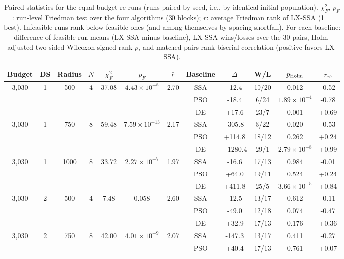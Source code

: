 \begin{table}[!t]
\centering
\caption{Paired statistics for the equal-budget re-runs (runs paired by seed, i.e., by identical initial population). $\chi^2_F$, $p_F$: run-level Friedman test over the four algorithms (30 blocks); $\bar r$: average Friedman rank of LX-SSA (1 = best). Infeasible runs rank below feasible ones (and among themselves by spacing shortfall). For each baseline: difference of feasible-run means (LX-SSA minus baseline), LX-SSA wins/losses over the 30 pairs, Holm-adjusted two-sided Wilcoxon signed-rank $p$, and matched-pairs rank-biserial correlation (positive favors LX-SSA).}
\label{tab:equalbudget-tests}
\scriptsize\setlength{\tabcolsep}{3pt}\renewcommand{\arraystretch}{0.93}
\begin{tabular}{cccccccccccc}
\toprule
Budget & DS & Radius & $N$ & $\chi^2_F$ & $p_F$ & $\bar r$ & Baseline & $\Delta$ & W/L & $p_{\rm Holm}$ & $r_{rb}$ \\
\midrule
3,030 & 1 & 500 & 4 & 37.08 & $4.43\times10^{-8}$ & 2.70 & SSA & -12.4 & 10/20 & 0.012 & -0.52 \\
 & & & & & &  & PSO & -18.4 & 6/24 & $1.89\times10^{-4}$ & -0.78 \\
 & & & & & &  & DE & +17.6 & 23/7 & 0.001 & +0.69 \\
\midrule
3,030 & 1 & 750 & 8 & 59.48 & $7.59\times10^{-13}$ & 2.17 & SSA & -305.8 & 8/22 & 0.020 & -0.53 \\
 & & & & & &  & PSO & +114.8 & 18/12 & 0.262 & +0.24 \\
 & & & & & &  & DE & +1280.4 & 29/1 & $2.79\times10^{-8}$ & +0.99 \\
\midrule
3,030 & 1 & 1000 & 8 & 33.72 & $2.27\times10^{-7}$ & 1.97 & SSA & -16.6 & 17/13 & 0.984 & -0.01 \\
 & & & & & &  & PSO & +64.0 & 19/11 & 0.524 & +0.24 \\
 & & & & & &  & DE & +411.8 & 25/5 & $3.66\times10^{-5}$ & +0.84 \\
\midrule
3,030 & 2 & 500 & 4 & 7.48 & 0.058 & 2.60 & SSA & -12.5 & 13/17 & 0.612 & -0.11 \\
 & & & & & &  & PSO & -49.0 & 12/18 & 0.074 & -0.47 \\
 & & & & & &  & DE & +32.9 & 17/13 & 0.176 & +0.36 \\
\midrule
3,030 & 2 & 750 & 8 & 42.00 & $4.01\times10^{-9}$ & 2.07 & SSA & -147.3 & 13/17 & 0.411 & -0.27 \\
 & & & & & &  & PSO & +40.4 & 17/13 & 0.761 & +0.07 \\

\end{tabular}
\end{table}
